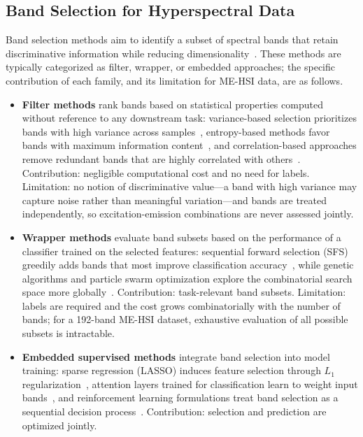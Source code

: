 \subsection{Band Selection for Hyperspectral Data}
\label{sec:related_band}

Band selection methods aim to identify a subset of spectral bands that retain discriminative information while reducing dimensionality~\cite{sun2019hyperspectral,sawant2021survey}.
These methods are typically categorized as filter, wrapper, or embedded approaches; the specific contribution of each family, and its limitation for ME-HSI data, are as follows.
\begin{itemize}
\item \textbf{Filter methods} rank bands based on statistical properties computed without reference to any downstream task: variance-based selection prioritizes bands with high variance across samples~\cite{chang2000constrained}, entropy-based methods favor bands with maximum information content~\cite{guo2006band}, and correlation-based approaches remove redundant bands that are highly correlated with others~\cite{martinez2006comparison}.
Contribution: negligible computational cost and no need for labels.
Limitation: no notion of discriminative value---a band with high variance may capture noise rather than meaningful variation---and bands are treated independently, so excitation-emission combinations are never assessed jointly.
\item \textbf{Wrapper methods} evaluate band subsets based on the performance of a classifier trained on the selected features: sequential forward selection (SFS) greedily adds bands that most improve classification accuracy~\cite{pudil1994floating}, while genetic algorithms and particle swarm optimization explore the combinatorial search space more globally~\cite{pal2010feature}.
Contribution: task-relevant band subsets.
Limitation: labels are required and the cost grows combinatorially with the number of bands; for a 192-band ME-HSI dataset, exhaustive evaluation of all possible subsets is intractable.
\item \textbf{Embedded supervised methods} integrate band selection into model training: sparse regression (LASSO) induces feature selection through $L_1$ regularization~\cite{tibshirani1996regression}, attention layers trained for classification learn to weight input bands~\cite{lorenzo2020attention}, and reinforcement learning formulations treat band selection as a sequential decision process~\cite{mou2022reinforcement}.
Contribution: selection and prediction are optimized jointly.

\end{itemize}
